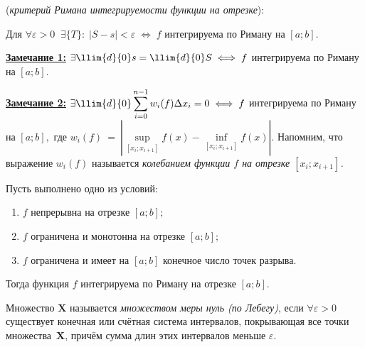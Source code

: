 \documentclass[10pt]{article}
\begin{document}
\begin{theorem}(\emph{критерий Римана интегрируемости функции на отрезке}):
\vspace{1ex}

Для $\forall \varepsilon > 0 \;\; \exists \{T\}: \; |S - s| < \varepsilon \; \Longleftrightarrow \; f$ интегрируема по Риману на $[a; b].$
\vspace{2ex}
\end{theorem}

\hspace{-3.5ex}\underline{\textbf{Замечание 1:}} \; $\exists \llim{d}{0} s = \llim{d}{0} S \; \Longleftrightarrow \; f$ интегрируема по Риману на $[a; b].$
\vspace{1ex}

\hspace{-3.5ex}\underline{\textbf{Замечание 2:}} \; $\displaystyle \exists \llim{d}{0} \sum\limits_{i=0}^{n-1} w_i(f) \Delta x_i = 0 \; \Longleftrightarrow \; f$ интегрируема по Риману на $[a; b],$  где $w_i(f)~=~\left|\sup\limits_{[x_i; x_{i+1}]} \!\!\! f(x) - \!\!\! \inf\limits_{[x_i; x_{i+1}]} \!\!\! f(x)\right|.$  Напомним, что выражение $w_i(f)$ называется \emph{колебанием функции $f$ на отрезке $[x_i; x_{i+1}]$.}

\vspace{3ex}

\begin{theorem} Пусть выполнено одно из условий:
\begin{enumerate}

\item $f$ непрерывна на отрезке $[a; b];$

\item $f$ ограничена и монотонна на отрезке $[a; b];$

\item $f$ ограничена и имеет на $[a; b]$ конечное число точек разрыва.
\end{enumerate}
Тогда функция $f$ интегрируема по Риману на отрезке $[a; b].$

\vspace{3ex}
\end{theorem}

\begin{definition} 
Множество $\textbf{X}$ называется \emph{множеством меры нуль (по Лебегу)}, если $\forall \varepsilon > 0$ существует конечная или счётная система интервалов, покрывающая все точки множества~$\textbf{X}$, причём сумма длин этих интервалов меньше $\varepsilon$.

\end{definition}
\end{document}
